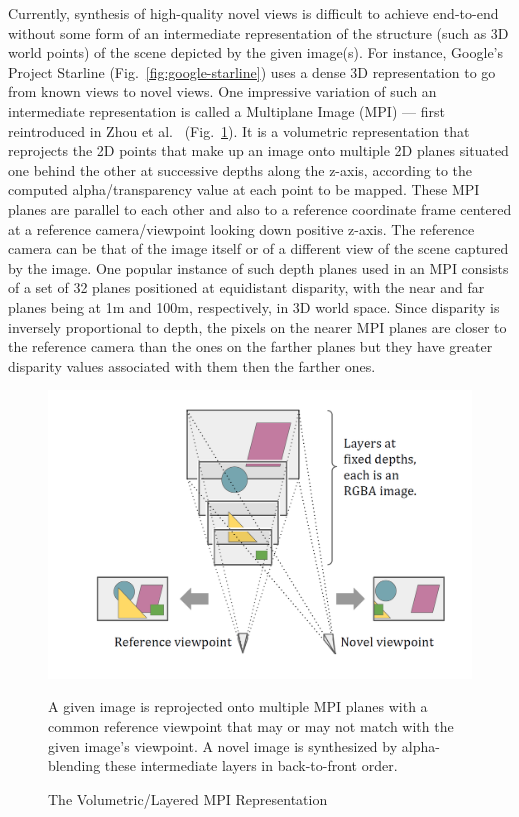 Currently, synthesis of high-quality novel views is difficult to achieve end-to-end without some form of an intermediate representation of the structure (such as 3D world points) of the scene depicted by the given image(s). For instance, Google's Project Starline (Fig.~\ref{fig:google-starline}) uses a dense 3D representation to go from known views to novel views. One impressive variation of such an intermediate representation is called a Multiplane Image (MPI) --- first reintroduced in Zhou et al.~\cite{zhou2018stereo} (Fig.~\ref{fig:mpi-layered-representation}). It is a volumetric representation that reprojects the 2D points that make up an image onto multiple 2D planes situated one behind the other at successive depths along the z-axis, according to the computed alpha/transparency value at each point to be mapped. These MPI planes are parallel to each other and also to a reference coordinate frame centered at a reference camera/viewpoint looking down positive z-axis. The reference camera can be that of the image itself or of a different view of the scene captured by the image. One popular instance of such depth planes used in an MPI consists of a set of 32 planes positioned at equidistant disparity, with the near and far planes being at 1m and 100m, respectively, in 3D world space. Since disparity is inversely proportional to depth, the pixels on the nearer MPI planes are closer to the reference camera than the ones on the farther planes but they have greater disparity values associated with them then the farther ones.

\begin{figure}[!h]
    \includegraphics[width=1\columnwidth]{figures/mpi-layered-representation.png}
    \caption{The Volumetric/Layered MPI Representation}
    \label{fig:mpi-layered-representation}
    {\small A given image is reprojected onto multiple MPI planes with a common reference viewpoint that may or may not match with the given image's viewpoint. A novel image is synthesized by alpha-blending these intermediate layers in back-to-front order.}
\end{figure}

